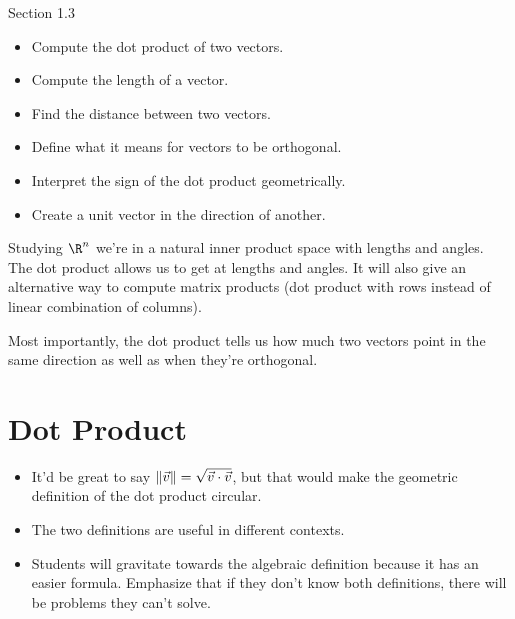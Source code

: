 \documentclass{problemset}
\newcommand{\bookonlynewpage}{\begin{bookonly}\newpage\end{bookonly}}
\begin{document}
\begin{lesson}

	Section 1.3

	\begin{itemize}
		\item Compute the dot product of two vectors.
		\item Compute the length of a vector.
		\item Find the distance between two vectors.
		\item Define what it means for vectors to be orthogonal.
		\item Interpret the sign of the dot product geometrically.
		\item Create a unit vector in the direction of another.
	\end{itemize}

	Studying $\R^n$ we're in a natural inner product space with lengths and
	angles. The dot product allows us to get at lengths and angles. It will
	also give an alternative way to compute matrix products (dot product with rows
	instead of linear combination of columns).

	Most importantly, the dot product tells us how much two vectors point in
	the same direction as well as when they're orthogonal.

\end{lesson}


	\bookonlynewpage
\section*{Dot Product}
	\begin{annotation}
		\begin{notes}
			\begin{itemize}
				\item It'd be great to say $\lVert\vec v\rVert=\sqrt{\vec v\cdot \vec v}$,
					but that would make the geometric definition of the dot product circular.
			\end{itemize}
		\end{notes}
	\end{annotation}

	\SavedDefinitionRender{Norm}

	\begin{annotation}
		\begin{notes}
			\begin{itemize}
				\item The two definitions are useful in different contexts.
				\item Students will gravitate towards the algebraic definition because
					it has an easier formula. Emphasize that if they don't know
					both definitions, there will be problems they can't solve.
			\end{itemize}
		\end{notes}
	\end{annotation}
\end{document}
